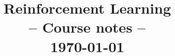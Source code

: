 \documentclass[12pt]{report}
\title{
{
	\sffamily\Huge
	\textbf{Reinforcement Learning}\\
	{\bluefont-- Course notes --}
}\\[2ex]
\normalsize\sffamily\today
}
\date{}
\begin{document}
\maketitle

\tableofcontents














\nocite{*}
\printbibliography
\end{document}
